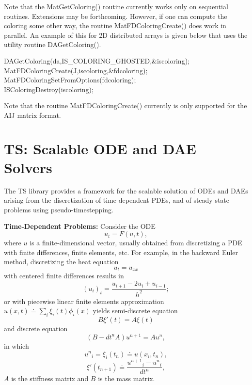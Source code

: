 Note that the MatGetColoring() routine currently 
works only on sequential routines.  Extensions may be forthcoming. However,
if one can compute the coloring  some other way, the routine
MatFDColoringCreate() does work in parallel. An example of this for 
2D distributed arrays is given below that uses the utility routine
DAGetColoring().

\begin{tabbing}
   DAGetColoring(da,IS\_COLORING\_GHOSTED,\&iscoloring);\\
   MatFDColoringCreate(J,iscoloring,\&fdcoloring); \\
   MatFDColoringSetFromOptions(fdcoloring);\\
   ISColoringDestroy(iscoloring);
\end{tabbing}

Note that the routine MatFDColoringCreate() currently is only 
supported for the AIJ matrix format.

\cleardoublepage
\chapter{TS: Scalable ODE and DAE Solvers}
\label{chapter_ts}

The TS library provides a framework for the scalable solution of ODEs and DAEs
arising from the discretization of time-dependent PDEs, and of
steady-state problems using pseudo-timestepping.

\vspace{.2cm}

\noindent

{\bf Time-Dependent Problems:} Consider the ODE
\[
              u_t = F(u,t),
\]
where $ u $ is a finite-dimensional vector, usually obtained from
discretizing a PDE with finite differences, finite elements, etc.
For example, in the backward Euler method, discretizing the heat equation 
\[
          u_t = u_{xx} 
\]
with centered finite differences results in 
\[
          (u_i)_t = \frac{u_{i+1} - 2 u_{i} + u_{i-1}}{h^2};
\]
or with piecewise linear finite elements approximation
$ u(x,t) \doteq \sum_i \xi_i(t) \phi_i(x)$ yields semi-discrete equation
\[
          B {\xi}'(t) = A \xi(t)
\]
and discrete equation
\[
        ( B - dt^n A  ) u^{n+1} = A u^n, 
\]
in which 
\[
         {u^n}_i = \xi_i(t_n) \doteq u(x_i,t_n),
\]
\[  
         {\xi}'(t_{n+1}) \doteq \frac{{u^{n+1}}_i - {u^{n}}_i }{dt^{n}},
\]
$A$ is the stiffness matrix and $B$ is the mass matrix.

